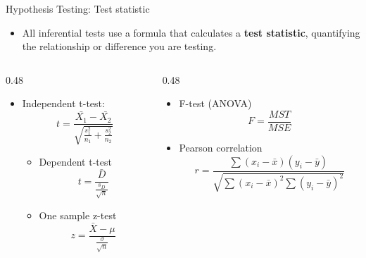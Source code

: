 \documentclass[
  ignorenonframetext,
]{beamer}
\providecommand{\tightlist}{%
  \setlength{\itemsep}{0pt}\setlength{\parskip}{0pt}}
\begin{document}
\begin{frame}{Hypothesis Testing: Test statistic}
\label{hypothesis-testing-test-statistic}
\begin{itemize}
\tightlist
\item
  All inferential tests use a formula that calculates a \textbf{test
  statistic}, quantifying the relationship or difference you are
  testing.
\end{itemize}

\begin{columns}[T]
\begin{column}{0.48\linewidth}
\small

\begin{itemize}
\item
  Independent t-test:
  \[t = \frac{\bar{X_1} - \bar{X_2}}{\sqrt{\frac{s_1^2}{n_1} + \frac{s_2^2}{n_2}}}\]

  \begin{itemize}
  \item
    Dependent t-test \[t = \frac{\bar{D}}{\frac{s_D}{\sqrt{n}}}\]
  \item
    One sample z-test
    \[z = \frac{\bar{X} - \mu}{\frac{\sigma}{\sqrt{n}}}\] \small  
  \end{itemize}
\end{itemize}
\end{column}

\begin{column}{0.48\linewidth}
\small

\begin{itemize}
\item
  F-test (ANOVA) \[F = \frac{MST}{MSE}\]
\item
  Pearson correlation
  \[r = \frac{\sum (x_i - \bar{x})(y_i - \bar{y})}{\sqrt{\sum (x_i - \bar{x})^2 \sum (y_i - \bar{y})^2}}\]\\
\end{itemize}
\end{column}
\end{columns}
\end{frame}
\end{document}
